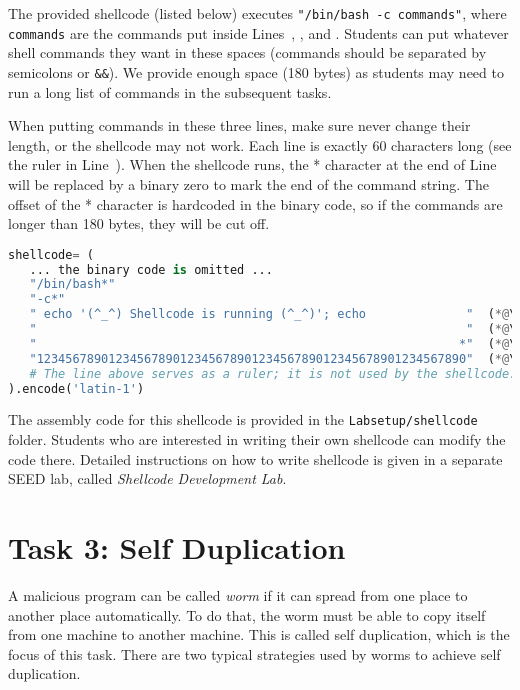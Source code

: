 The provided shellcode (listed below) 
executes \texttt{"/bin/bash -c commands"},
where \texttt{commands} are the commands put inside  
Lines~\lineone, \linetwo, and \linethree. 
Students can put whatever shell commands they want in 
these spaces (commands should be separated by semicolons or \texttt{\&\&}).
We provide enough space (180 bytes) as students may need to 
run a long list of commands in the 
subsequent tasks. 

When putting commands in these three lines, make sure 
never change their length, or the shellcode may not work.  
Each line is exactly 60 characters long (see the ruler in Line~\linefour).
When the shellcode runs, the * character at the end of Line~\linethree 
will be replaced by a binary zero to mark the end of the command string. 
The offset of the * character is hardcoded in the binary code, so
if the commands are longer than 180 bytes, they will be cut off.

\begin{lstlisting}[language=Python]
shellcode= (
   ... the binary code is omitted ... 
   "/bin/bash*"
   "-c*"
   " echo '(^_^) Shellcode is running (^_^)'; echo              "  (*@\lineone@*)
   "                                                            "  (*@\linetwo@*) 
   "                                                           *"  (*@\linethree@*) 
   "123456789012345678901234567890123456789012345678901234567890"  (*@\linefour@*) 
   # The line above serves as a ruler; it is not used by the shellcode.
).encode('latin-1')
\end{lstlisting}
 

The assembly code for this shellcode is provided in
the \texttt{Labsetup/shellcode} folder. Students who 
are interested in writing their own shellcode can 
modify the code there. Detailed instructions on 
how to write shellcode is given in a separate 
SEED lab, called \textit{Shellcode Development Lab}. 



\section{Task 3: Self Duplication} 

A malicious program can be called \textit{worm} if it
can spread from one place to another place automatically. 
To do that, the worm must be able to copy itself 
from one machine to another machine. This is called 
self duplication, which is the focus of this task.
There are two typical strategies used by worms 
to achieve self duplication. 

